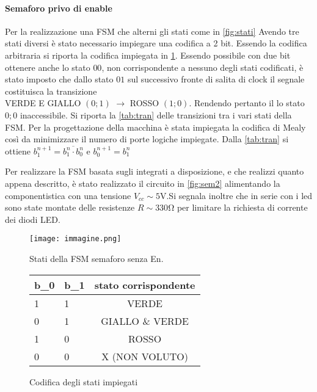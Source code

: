 
\paragraph{Semaforo privo di enable}
Per la realizzazione una FSM che alterni gli stati come in \figurename{\ref{fig:stati}}
Avendo tre stati diversi è stato necessario impiegare una codifica a 2 bit.
Essendo la codifica arbitraria si riporta la codifica impiegata in 
\tablename{\ref{tab:cod}}.
Essendo possibile con due bit ottenere anche lo stato $00$,  non corrispondente a nessuno degli stati codificati,
è stato imposto che dallo stato $01$ sul successivo fronte di salita di clock il segnale costituisca
la transizione \\VERDE E GIALLO $(0;1)$  $\longrightarrow$ ROSSO $(1;0)$.
Rendendo pertanto il lo stato $0;0$ inaccessibile.
Si riporta la \tablename{ \ref{tab:tran}} delle transizioni tra i vari stati della FSM.
Per la progettazione della macchina è stata impiegata la codifica di Mealy così da minimizzare il numero di porte logiche impiegate.
Dalla \tablename{ \ref{tab:tran}} si ottiene  $b_{1}^{n+1} =  \overline{b_{1}^{n} \cdot b_{0}^{n}}$ e $b_{0}^{n+1} = b_{1}^{n}$

Per realizzare la FSM basata sugli integrati a disposizione, e che realizzi quanto appena descritto,
 è stato realizzato il circuito in \figurename{ \ref{fig:sem2}} alimentando la componentistica con una tensione 
 $V_{cc}\sim 5$\si{\volt}.Si segnala inoltre che in serie con i led sono state montate delle resistenze $R\sim 330$\si{\ohm} per limitare la richiesta di corrente dei diodi LED.
\begin{figure}[h!]
	\begin{minipage}{0.5\textwidth}
		\centering
		\texttt{[image: immagine.png]}
		\caption{Stati della FSM semaforo senza En.}
		\label{fig:stati}
	\end{minipage}
\begin{minipage}{0.5\textwidth}
	\centering
	\begin{tabular}{ssc}
	\toprule
	b_{0} & b_{1} & stato corrispondente\\
	 & 1 & VERDE\\
	0 & 1 & GIALLO \& VERDE\\
	1 & 0 & ROSSO\\
	0 & 0 &  X (NON VOLUTO)\\
	\bottomrule
	\end{tabular}
	\caption{Codifica degli stati impiegati}
	\label{tab:cod}
\end{minipage}
\end{figure}


